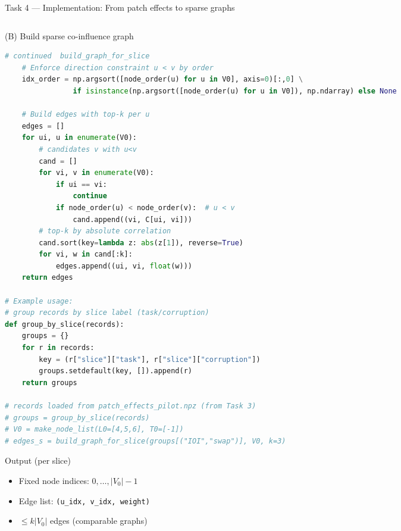 \documentclass[aspectratio=169,xcolor={dvipsnames}]{beamer}
\begin{document}
\begin{frame}[fragile,shrink=54]{Task 4 — Implementation: From patch effects to sparse graphs}
\begin{columns}[T,onlytextwidth]
\begin{column}{0.48\textwidth}
\begin{block}{(B) Build sparse co-influence graph}
\footnotesize
\begin{lstlisting}[language=Python,basicstyle=\ttfamily\scriptsize]
    # continued  build_graph_for_slice
    # Enforce direction constraint u < v by order
    idx_order = np.argsort([node_order(u) for u in V0], axis=0)[:,0] \
                if isinstance(np.argsort([node_order(u) for u in V0]), np.ndarray) else None

    # Build edges with top-k per u
    edges = []
    for ui, u in enumerate(V0):
        # candidates v with u<v
        cand = []
        for vi, v in enumerate(V0):
            if ui == vi: 
                continue
            if node_order(u) < node_order(v):  # u < v
                cand.append((vi, C[ui, vi]))
        # top-k by absolute correlation
        cand.sort(key=lambda z: abs(z[1]), reverse=True)
        for vi, w in cand[:k]:
            edges.append((ui, vi, float(w)))
    return edges

# Example usage:
# group records by slice label (task/corruption)
def group_by_slice(records):
    groups = {}
    for r in records:
        key = (r["slice"]["task"], r["slice"]["corruption"])
        groups.setdefault(key, []).append(r)
    return groups

# records loaded from patch_effects_pilot.npz (from Task 3)
# groups = group_by_slice(records)
# V0 = make_node_list(L0=[4,5,6], T0=[-1])
# edges_s = build_graph_for_slice(groups[("IOI","swap")], V0, k=3)
\end{lstlisting}
\end{block}

\begin{block}{Output (per slice)}
\footnotesize
\begin{itemize}\setlength\itemsep{2pt}
\item Fixed node indices: $0,\dots,|V_0|-1$
\item Edge list: \texttt{(u\_idx, v\_idx, weight)}
\item $\le k|V_0|$ edges (comparable graphs)
\end{itemize}
\end{block}
\end{column}

\end{columns}
\end{frame}
\end{document}

